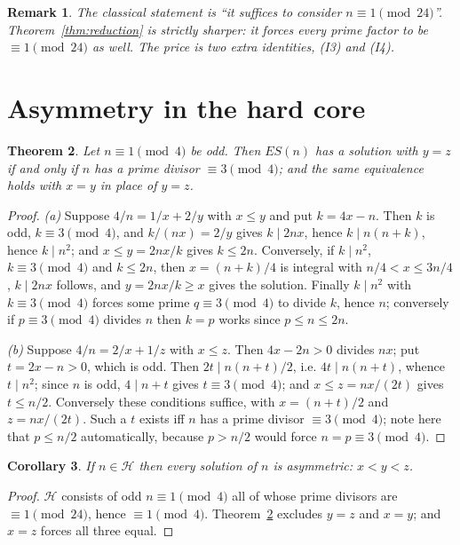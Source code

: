\documentclass[11pt,a4paper]{article}
\newtheorem{theorem}{Theorem}
\newtheorem{corollary}[theorem]{Corollary}
\newtheorem{remark}[theorem]{Remark}
\theoremstyle{definition}
\begin{document}
\begin{remark}
The classical statement is ``it suffices to consider $n\equiv 1\pmod{24}$''.
Theorem~\ref{thm:reduction} is strictly sharper: it forces every prime factor
to be $\equiv 1\pmod{24}$ as well. The price is two extra identities, (I3) and
(I4).
\end{remark}

\section{Asymmetry in the hard core}\label{sec:asymmetry}

\begin{theorem}\label{thm:repeat}
Let $n\equiv 1\pmod 4$ be odd. Then $ES(n)$ has a solution with $y=z$ if and
only if $n$ has a prime divisor $\equiv 3\pmod 4$; and the same equivalence
holds with $x=y$ in place of $y=z$.
\end{theorem}
\begin{proof}
\emph{(a)} Suppose $4/n=1/x+2/y$ with $x\le y$ and put $k=4x-n$. Then $k$ is odd,
$k\equiv 3\pmod 4$, and $k/(nx)=2/y$ gives $k\mid 2nx$, hence
$k\mid n(n+k)$, hence $k\mid n^{2}$; and $x\le y=2nx/k$ gives $k\le 2n$.
Conversely, if $k\mid n^{2}$, $k\equiv 3\pmod 4$ and $k\le 2n$, then
$x=(n+k)/4$ is integral with $n/4<x\le 3n/4$, $k\mid 2nx$ follows, and
$y=2nx/k\ge x$ gives the solution. Finally $k\mid n^{2}$ with
$k\equiv 3\pmod 4$ forces some prime $q\equiv 3\pmod 4$ to divide $k$, hence
$n$; conversely if $p\equiv 3\pmod 4$ divides $n$ then $k=p$ works since
$p\le n\le 2n$.

\emph{(b)} Suppose $4/n=2/x+1/z$ with $x\le z$. Then $4x-2n>0$ divides $nx$; put
$t=2x-n>0$, which is odd. Then $2t\mid n(n+t)/2$, i.e. $4t\mid n(n+t)$, whence
$t\mid n^{2}$; since $n$ is odd, $4\mid n+t$ gives $t\equiv 3\pmod 4$; and
$x\le z=nx/(2t)$ gives $t\le n/2$. Conversely these conditions suffice, with
$x=(n+t)/2$ and $z=nx/(2t)$. Such a $t$ exists iff $n$ has a prime divisor
$\equiv 3\pmod 4$; note here that $p\le n/2$ automatically, because
$p>n/2$ would force $n=p\equiv 3\pmod 4$.
\end{proof}

\begin{corollary}\label{cor:asym}
If $n\in\mathcal H$ then every solution of $n$ is asymmetric: $x<y<z$.
\end{corollary}
\begin{proof}
$\mathcal H$ consists of odd $n\equiv 1\pmod 4$ all of whose prime divisors are
$\equiv 1\pmod{24}$, hence $\equiv 1\pmod 4$. Theorem~\ref{thm:repeat} excludes
$y=z$ and $x=y$; and $x=z$ forces all three equal.
\end{proof}
\end{document}
